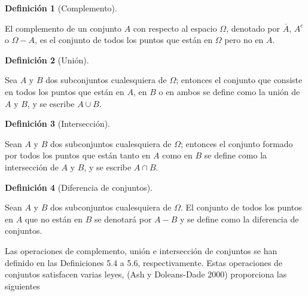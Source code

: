 \documentclass[
  letterpaper,
  DIV=11,
  numbers=noendperiod]{scrreport}
\theoremstyle{plain}
\theoremstyle{definition}
\newtheorem{definition}{Definición}[chapter]
\theoremstyle{definition}
\theoremstyle{plain}
\theoremstyle{remark}
\begin{document}
\begin{definition}[Complemento]\protect\hypertarget{def-comp}{}\label{def-comp}

El complemento de un conjunto \(A\) con respecto al espacio \(\Omega\),
denotado por \(\overline{A}\), \(A^c\) o \(\Omega-A\), es el conjunto de
todos los puntos que están en \(\Omega\) pero no en \(A\).

\end{definition}

\begin{definition}[Unión]\protect\hypertarget{def-union}{}\label{def-union}

Sea \(A\) y \(B\) dos subconjuntos cualesquiera de \(\Omega\); entonces
el conjunto que consiste en todos los puntos que están en \(A\), en
\(B\) o en ambos se define como la unión de \(A\) y \(B\), y se escribe
\(A \cup B\).

\end{definition}

\begin{definition}[Intersección]\protect\hypertarget{def-inter}{}\label{def-inter}

Sean \(A\) y \(B\) dos subconjuntos cualesquiera de \(\Omega\); entonces
el conjunto formado por todos los puntos que están tanto en \(A\) como
en \(B\) se define como la intersección de \(A\) y \(B\), y se escribe
\(A \cap B\).

\end{definition}

\begin{definition}[Diferencia de
conjuntos]\protect\hypertarget{def-dfc}{}\label{def-dfc}

Sean \(A\) y \(B\) dos subconjuntos cualesquiera de \(\Omega\). El
conjunto de todos los puntos en \(A\) que no están en \(B\) se denotará
por \(A-B\) y se define como la diferencia de conjuntos.

\end{definition}

Las operaciones de complemento, unión e intersección de conjuntos se han
definido en las Definiciones 5.4 a 5.6, respectivamente. Estas
operaciones de conjuntos satisfacen varias leyes, (Ash y Doleans-Dade
2000) proporciona las siguientes
\end{document}
